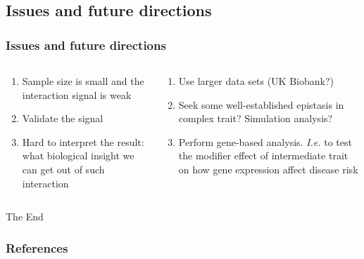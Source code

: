 \documentclass{beamer}
\begin{document}
  \subsection{Issues and future directions}
  \begin{frame}
  \frametitle{Issues and future directions}
    \begin{columns}
      \begin{column}{.39\textwidth}
        \begin{enumerate}
          \item Sample size is small and the interaction signal is weak
          \item Validate the signal
          \item Hard to interpret the result: what biological insight we can get out of such interaction
        \end{enumerate}
      \end{column}
      \begin{column}{.59\textwidth}
        \begin{enumerate}
          \item Use larger data sets (UK Biobank?)
          \item Seek some well-established epistasis in complex trait? Simulation analysis?
          \item Perform gene-based analysis. \textit{I.e.} to test the modifier effect of intermediate trait on how gene expression affect disease risk
        \end{enumerate}
      \end{column}
    \end{columns}
  \end{frame}


\begin{frame}
\Huge{\centerline{The End}}
\end{frame}

%

\begin{frame}[allowframebreaks]
\frametitle{References}
\footnotesize


\end{frame}

\end{document}

